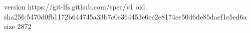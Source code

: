 version https://git-lfs.github.com/spec/v1
oid sha256:5470d0fb1172b644745a33b7c0e364453e6ee2e8174ee50d6de85daef1c5ed6a
size 2872
